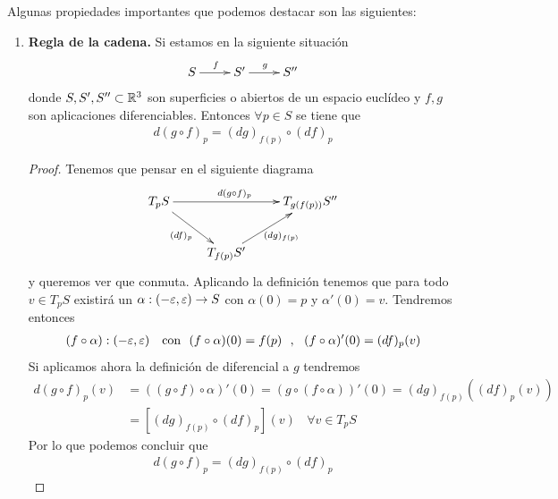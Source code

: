 \begin{propiedades}
    Algunas propiedades importantes que podemos destacar son las siguientes:
    \begin{enumerate}
        \item \textbf{Regla de la cadena.} Si estamos en la siguiente situación
        \begin{gather*}
            \xymatrix{
                S \ar[r]^f & S' \ar[r]^g & S''
            }
        \end{gather*}
        donde $S,S',S''\subset \mathbb{R}^3$ son superficies o abiertos de un espacio euclídeo y $f,g$ son aplicaciones diferenciables. Entonces $\forall p \in S$ se tiene que 
        \begin{gather*}
            d(g\circ f)_p = (dg)_{f(p)}\circ (df)_p
        \end{gather*}
        \begin{proof}
            Tenemos que pensar en el siguiente diagrama
            \begin{gather*}
                \xymatrix{
                    T_pS \ar[rr]^{d(g\circ f)_p} \ar[dr]_{(df)_p} && T_{g(f(p))}S''\\
                    & T_{f(p)}S' \ar[ur]_{(dg)_{f(p)}}
                }
            \end{gather*}
            y queremos ver que conmuta. Aplicando la definición tenemos que para todo $v\in T_pS$ existirá un $\alpha: (-\varepsilon, \varepsilon) \to S$ con $\alpha(0)=p$ y $\alpha'(0)=v$. Tendremos entonces 
            \begin{gather*}
                (f\circ \alpha):(-\varepsilon,\varepsilon) \ \ \text{ con }\ (f\circ \alpha)(0) = f(p) \ \ ,\ \ (f\circ \alpha)'(0) = (df)_p(v)
            \end{gather*}
            Si aplicamos ahora la definición de diferencial a $g$ tendremos 
            \begin{align*}
                d(g\circ f)_p(v) &= ((g\circ f)\circ \alpha)'(0) = (g\circ(f\circ \alpha))'(0) = (dg)_{f(p)}((df)_p(v))\\
                &= [(dg)_{f(p)} \circ (df)_p](v)\ \ \ \ \forall v \in T_pS
            \end{align*}
            Por lo que podemos concluir que 
            \begin{gather*}
                d(g\circ f)_p = (dg)_{f(p)} \circ (df)_p
            \end{gather*}
        \end{proof}


\end{enumerate}
\end{propiedades}
